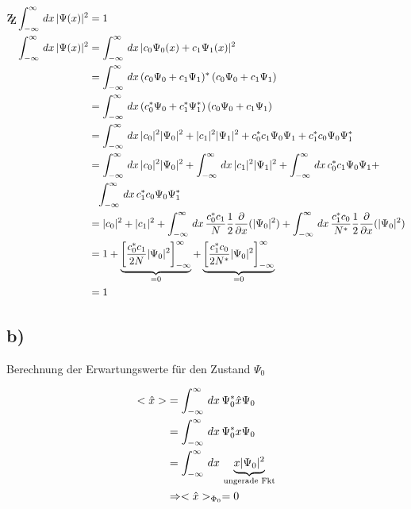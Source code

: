 \begin{align*}
    \mathrm{Z\kern-.3em\raise-0.5ex\hbox{Z}} \int_{-\infty}^{\infty} \, dx \, \abs{\Psi (x)}^2&=1\\
    \int_{-\infty}^{\infty} \, dx\, \abs{\Psi (x)}^2 &= \int_{-\infty}^{\infty}\, dx\, \abs{c_0 \Psi _0 (x) + c_1 \Psi _1(x)}^2\\
    &=\int_{-\infty}^{\infty} \, dx\, (c_0 \Psi _0  + c_1 \Psi _1)^* \,(c_0 \Psi _0  + c_1 \Psi _1)\\
    &=\int_{-\infty}^{\infty} \, dx\, (c_0^* \Psi _0  + c_1^* \Psi _1^*) \,(c_0 \Psi _0  + c_1 \Psi _1)\\
    &=\int_{-\infty}^{\infty} \, dx\, \abs{c_0}^2 \abs{\Psi _0}^2+\abs{c_1}^2 \abs{\Psi _1}^2 + c_0^* c_1 \Psi _0 \Psi _1+c_1^* c_0 \Psi _0 \Psi_1^*\\
    &=\int_{-\infty}^{\infty} \, dx\, \abs{c_0}^2 \abs{\Psi _0}^2 +\int_{-\infty}^{\infty} \, dx\,\abs{c_1}^2 \abs{\Psi _1}^2 +\int_{-\infty}^{\infty} \, dx\, c_0^* c_1 \Psi _0 \Psi _1+ \\
    &\phantom{=} \int_{-\infty}^{\infty} \, dx\, c_1^* c_0 \Psi _0 \Psi_1^*\\
    &= \abs{c_0}^2+\abs{c_1}^2+ \int_{-\infty}^ {\infty}\,dx\, \frac{c_0^*c_1}{N}\frac{1}{2} \frac{\partial}{\partial x}(\abs{\Psi _0}^2)+ \int_{-\infty}^{\infty} \,dx\, \frac{c_1^*c_0}{N^*}\frac{1}{2}\frac{\partial}{\partial x}(\abs{\Psi _0}^2) \\
    &= 1+ \underbrace{\left[\frac{c_0^*c_1}{2N}\abs{\Psi _0}^2\right]_{-\infty}^{\infty}}_{=0} + \underbrace{\left[\frac{c_1^*c_0}{2N^*}\abs{\Psi _0}^2 \right]_{-\infty}^{\infty}}_{=0} \\
    &=1
\end{align*}

\subsection{b)}

Berechnung der Erwartungswerte für den Zustand $\Psi _0$

\begin{align}
    <\hat x > &= \int_{-\infty}^{\infty}\,dx\, \Psi _0^* \hat x \Psi _0\\
    &= \int_{-\infty}^{\infty} \,dx\, \Psi _0^* x \Psi _0\\
    &= \int_{-\infty}^{\infty} \,dx\, \underbrace{x \lvert\Psi _0\rvert^2}_{\text{ungerade Fkt}}\\
    &\Rightarrow <\hat x>_{\Phi _0}=0
\end{align}


